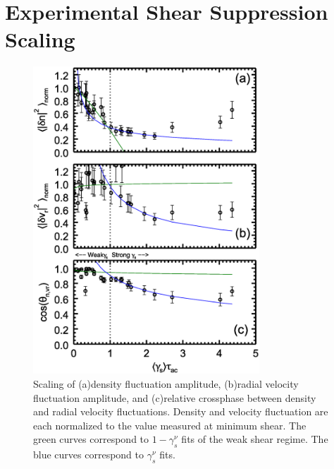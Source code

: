 \documentclass[aip,pop,amsmath,amssymb,reprint,superscriptaddress]{revtex4-1} %
\begin{document}
\section{Experimental Shear Suppression Scaling}

\begin{figure}[!htbp]
\centerline{
\includegraphics[width=8.5cm]{figure2.eps}}
\caption{\label{fig:densvrcp} Scaling of (a)density fluctuation amplitude, (b)radial velocity fluctuation amplitude, and (c)relative crossphase between density and radial velocity fluctuations. Density and velocity fluctuation are each normalized to the value measured at minimum shear. The green curves correspond to $1-\gamma_{s}^{\nu}$ fits of the weak shear regime. The blue curves correspond to $\gamma_{s}^{\nu}$ fits.}
\end{figure}
\end{document}
